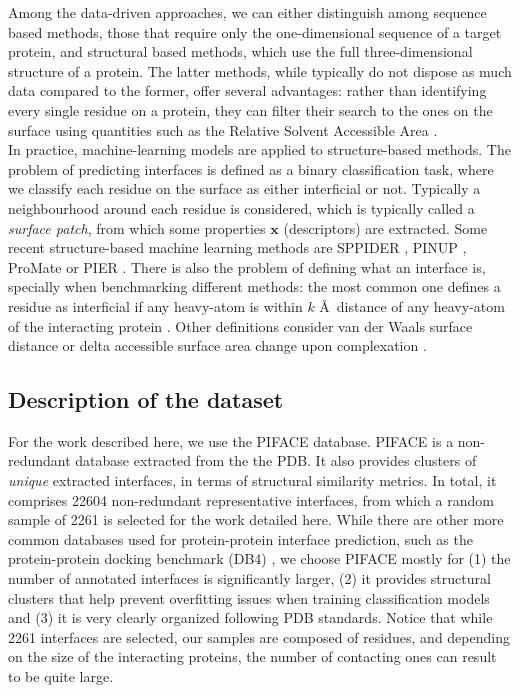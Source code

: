 \documentclass[10pt,a4paper,twoside]{book}
\begin{document}
Among the data-driven approaches, we can either distinguish among sequence based methods, those that require only the one-dimensional sequence of a target protein, and structural based methods, which use the full three-dimensional structure of a protein. The latter methods, while typically do not dispose as much data compared to the former, offer several advantages: rather than identifying every single residue on a protein, they can filter their search to the ones on the surface using quantities such as the Relative Solvent Accessible Area \cite{Tien2013}.\\

In practice, machine-learning models are applied to structure-based methods. The problem of predicting interfaces is defined as a binary classification task, where we classify each residue on the surface as either interficial or not. Typically a neighbourhood around each residue is considered, which is typically called a \textit{surface patch}, from which some properties $\boldsymbol{x}$ (descriptors) are extracted. Some recent structure-based machine learning methods are SPPIDER \cite{Porollo2007}, PINUP \cite{Liang2006}, ProMate \cite{Neuvirth2004} or PIER \cite{Kufareva2007}. There is also the problem of defining what an interface is, specially when benchmarking different methods: the most common one defines a residue as interficial if any heavy-atom is within $k$ \AA\ distance of any heavy-atom of the interacting protein \cite{AfsarMinhas2014}. Other definitions consider van der Waals surface distance \cite{Jordan2012} or delta accessible surface area change upon complexation \cite{Jones1997}.

\subsection{Description of the dataset}

For the work described here, we use the PIFACE \cite{Cukuroglu2014} database. PIFACE is a non-redundant database extracted from the the PDB. It also provides clusters of \textit{unique} extracted interfaces, in terms of structural similarity metrics. In total, it comprises 22604 non-redundant representative interfaces, from which a random sample of 2261 is selected for the work detailed here. While there are other more common databases used for protein-protein interface prediction, such as the protein-protein docking benchmark (DB4) \cite{Hwang2010}, we choose PIFACE mostly for (1) the number of annotated interfaces is significantly larger, (2) it provides structural clusters that help prevent overfitting issues when training classification models and (3) it is very clearly organized following PDB standards. Notice that while 2261 interfaces are selected, our samples are composed of residues, and depending on the size of the interacting proteins, the number of contacting ones can result to be quite large.\\
\end{document}
